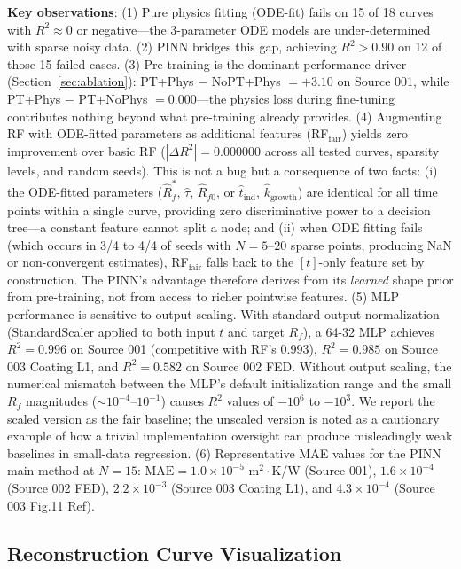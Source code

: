 \documentclass[review]{elsarticle}
\begin{document}
\textbf{Key observations}: (1) Pure physics fitting (ODE-fit) fails on 15 of 18 curves with $R^2 \approx 0$ or negative---the 3-parameter ODE models are under-determined with sparse noisy data. (2) PINN bridges this gap, achieving $R^2 > 0.90$ on 12 of those 15 failed cases. (3) Pre-training is the dominant performance driver (Section~\ref{sec:ablation}): PT+Phys $-$ NoPT+Phys $= +3.10$ on Source 001, while PT+Phys $-$ PT+NoPhys $= 0.000$---the physics loss during fine-tuning contributes nothing beyond what pre-training already provides. (4) Augmenting RF with ODE-fitted parameters as additional features (RF$_{\text{fair}}$) yields zero improvement over basic RF ($|\Delta R^2| = 0.000000$ across all tested curves, sparsity levels, and random seeds). This is not a bug but a consequence of two facts: (i) the ODE-fitted parameters ($\hat{R}_f^*$, $\hat{\tau}$, $\hat{R}_{f0}$, or $\hat{t}_{\text{ind}}$, $\hat{k}_{\text{growth}}$) are identical for all time points within a single curve, providing zero discriminative power to a decision tree---a constant feature cannot split a node; and (ii) when ODE fitting fails (which occurs in 3/4 to 4/4 of seeds with $N=5$--$20$ sparse points, producing NaN or non-convergent estimates), RF$_{\text{fair}}$ falls back to the $[t]$-only feature set by construction. The PINN's advantage therefore derives from its \textit{learned} shape prior from pre-training, not from access to richer pointwise features. (5) MLP performance is sensitive to output scaling. With standard output normalization (StandardScaler applied to both input $t$ and target $R_f$), a 64-32 MLP achieves $R^2 = 0.996$ on Source 001 (competitive with RF's 0.993), $R^2 = 0.985$ on Source 003 Coating L1, and $R^2 = 0.582$ on Source 002 FED. Without output scaling, the numerical mismatch between the MLP's default initialization range and the small $R_f$ magnitudes ($\sim 10^{-4}$--$10^{-1}$) causes $R^2$ values of $-10^6$ to $-10^3$. We report the scaled version as the fair baseline; the unscaled version is noted as a cautionary example of how a trivial implementation oversight can produce misleadingly weak baselines in small-data regression. (6) Representative MAE values for the PINN main method at $N=15$: $\text{MAE} = 1.0 \times 10^{-5}$ m$^2\cdot$K/W (Source 001), $1.6 \times 10^{-4}$ (Source 002 FED), $2.2 \times 10^{-3}$ (Source 003 Coating L1), and $4.3 \times 10^{-4}$ (Source 003 Fig.11 Ref).

\subsection{Reconstruction Curve Visualization}
\end{document}
